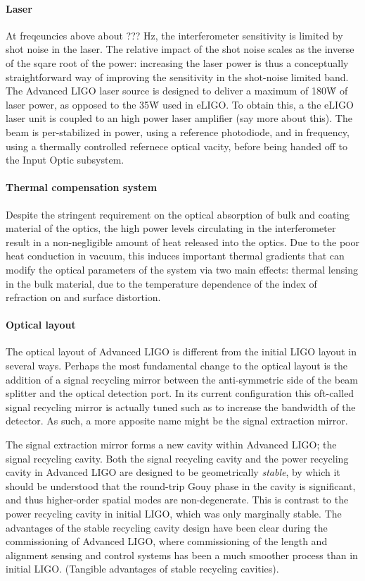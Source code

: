 \paragraph*{Laser}
At freqeuncies above about ??? Hz, the interferometer sensitivity is limited by shot noise in the laser. The relative impact of the shot noise scales as the inverse of the sqare root of the power: increasing the laser power is thus a conceptually straightforward way of improving the sensitivity in the shot-noise limited band. The Advanced LIGO laser source is designed to deliver a maximum of 180\.W of laser power, as opposed to the 35\.W used in eLIGO. To obtain this, a the eLIGO laser unit is coupled to an high power laser amplifier (say more about this). The beam is per-stabilized in power, using a reference photodiode, and in frequency, using a thermally controlled refernece optical vacity, before being handed off to the Input Optic subsystem.

\paragraph*{Thermal compensation system}
Despite the stringent requirement on the optical absorption of bulk and coating material of the optics, the high power levels circulating in the interferometer result in a non-negligible amount of heat released into the optics. Due to the poor heat conduction in vacuum, this induces important thermal gradients that can modify the optical parameters of the system via two main effects: thermal lensing in the bulk material, due to the temperature dependence of the index of refraction on  and surface distortion. 

\paragraph*{Optical layout}
The optical layout of Advanced LIGO is different from the initial LIGO layout in several ways. 
Perhaps the most fundamental change to the optical layout is the addition of a signal recycling 
mirror between the anti-symmetric side of the beam splitter and the optical detection port. 
In its current configuration this oft-called signal recycling mirror is actually tuned such as to 
increase the bandwidth of the detector. As such, a more apposite name might be the signal extraction mirror. 

The signal extraction mirror forms a new cavity within Advanced LIGO; the signal recycling cavity. 
Both the signal recycling cavity and the power recycling cavity in Advanced LIGO are designed to be 
geometrically \emph{stable}, by which it should be understood that the round-trip Gouy phase in the cavity 
is significant, and thus higher-order spatial modes are non-degenerate. 
This is contrast to the power recycling cavity in initial LIGO, which was only marginally stable. 
The advantages of the stable recycling cavity design have been clear during the commissioning of 
Advanced LIGO, where commissioning of the length and alignment sensing and control systems has 
been a much smoother process than in initial LIGO. (Tangible advantages of stable recycling cavities). 

